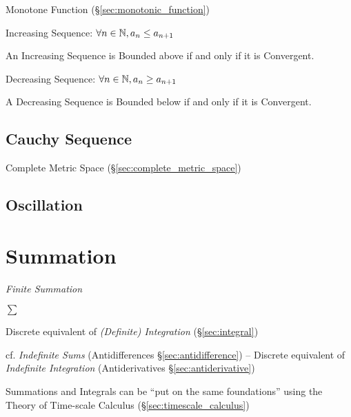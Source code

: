 Monotone Function (\S\ref{sec:monotonic_function})

Increasing Sequence: $\forall n \in \mathbb{N}, a_n \leq a_{n+1}$

An Increasing Sequence is Bounded above if and only if it is
Convergent.

Decreasing Sequence: $\forall n \in \mathbb{N}, a_n \geq a_{n+1}$

A Decreasing Sequence is Bounded below if and only if it is
Convergent.



\subsection{Cauchy Sequence}\label{sec:cauchy_sequence}

Complete Metric Space (\S\ref{sec:complete_metric_space})



\subsection{Oscillation}\label{sec:oscillation}



\section{Summation}\label{sec:summation}

\emph{Finite Summation}

$\sum$

Discrete equivalent of \emph{(Definite) Integration} (\S\ref{sec:integral})

\fist cf. \emph{Indefinite Sums} (Antidifferences \S\ref{sec:antidifference}) --
Discrete equivalent of \emph{Indefinite Integration} (Antiderivatives
\S\ref{sec:antiderivative})

Summations and Integrals can be ``put on the same foundations'' using the Theory
of Time-scale Calculus (\S\ref{sec:timescale_calculus})



